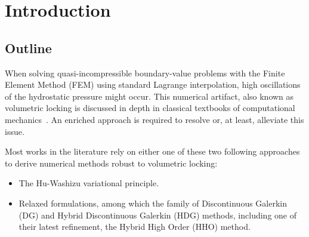 \section{Introduction}
\label{sec_introduction}

\subsection{Outline}
\label{sec_introduction_outline}


When solving quasi-incompressible boundary-value problems with the
Finite Element Method (FEM) using standard Lagrange interpolation, high
oscillations of the hydrostatic pressure might occur. This numerical
artifact, also known as volumetric locking is discussed in depth in
classical textbooks of computational
mechanics~\cite{simo_computational_1998, belytschko_nonlinear_nodate, neto_computational_2008}.
An enriched approach is required to resolve or, at least, alleviate
this issue.

Most works in the literature rely on either one of these two
following approaches to derive numerical methods robust to volumetric
locking:
\begin{itemize}
  \item The Hu-Washizu variational principle.
  \item Relaxed formulations, among which the family
  of Discontinuous Galerkin (DG) and Hybrid Discontinuous Galerkin (HDG)
  methods, including one of their latest refinement, the Hybrid High Order
  (HHO) method.
\end{itemize}


